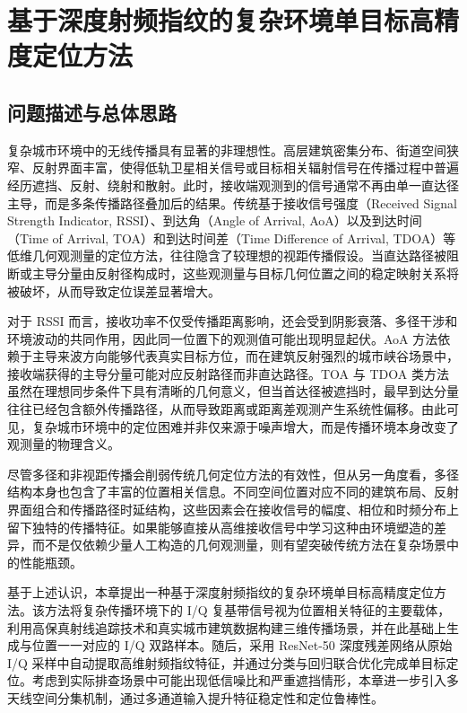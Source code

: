 \chapter{基于深度射频指纹的复杂环境单目标高精度定位方法}
\label{ch:single_target}

\section{问题描述与总体思路}
\label{sec:3_1}

复杂城市环境中的无线传播具有显著的非理想性。高层建筑密集分布、街道空间狭窄、反射界面丰富，使得低轨卫星相关信号或目标相关辐射信号在传播过程中普遍经历遮挡、反射、绕射和散射。此时，接收端观测到的信号通常不再由单一直达径主导，而是多条传播路径叠加后的结果。传统基于接收信号强度（Received Signal Strength Indicator, RSSI）、到达角（Angle of Arrival, AoA）以及到达时间（Time of Arrival, TOA）和到达时间差（Time Difference of Arrival, TDOA）等低维几何观测量的定位方法，往往隐含了较理想的视距传播假设。当直达路径被阻断或主导分量由反射径构成时，这些观测量与目标几何位置之间的稳定映射关系将被破坏，从而导致定位误差显著增大。

对于 RSSI 而言，接收功率不仅受传播距离影响，还会受到阴影衰落、多径干涉和环境波动的共同作用，因此同一位置下的观测值可能出现明显起伏。AoA 方法依赖于主导来波方向能够代表真实目标方位，而在建筑反射强烈的城市峡谷场景中，接收端获得的主导分量可能对应反射路径而非直达路径。TOA 与 TDOA 类方法虽然在理想同步条件下具有清晰的几何意义，但当首达径被遮挡时，最早到达分量往往已经包含额外传播路径，从而导致距离或距离差观测产生系统性偏移。由此可见，复杂城市环境中的定位困难并非仅来源于噪声增大，而是传播环境本身改变了观测量的物理含义。

尽管多径和非视距传播会削弱传统几何定位方法的有效性，但从另一角度看，多径结构本身也包含了丰富的位置相关信息。不同空间位置对应不同的建筑布局、反射界面组合和传播路径时延结构，这些因素会在接收信号的幅度、相位和时频分布上留下独特的传播特征。如果能够直接从高维接收信号中学习这种由环境塑造的差异，而不是仅依赖少量人工构造的几何观测量，则有望突破传统方法在复杂场景中的性能瓶颈。

基于上述认识，本章提出一种基于深度射频指纹的复杂环境单目标高精度定位方法。该方法将复杂传播环境下的 I/Q 复基带信号视为位置相关特征的主要载体，利用高保真射线追踪技术和真实城市建筑数据构建三维传播场景，并在此基础上生成与位置一一对应的 I/Q 双路样本。随后，采用 ResNet-50 深度残差网络从原始 I/Q 采样中自动提取高维射频指纹特征，并通过分类与回归联合优化完成单目标定位。考虑到实际排查场景中可能出现低信噪比和严重遮挡情形，本章进一步引入多天线空间分集机制，通过多通道输入提升特征稳定性和定位鲁棒性。

